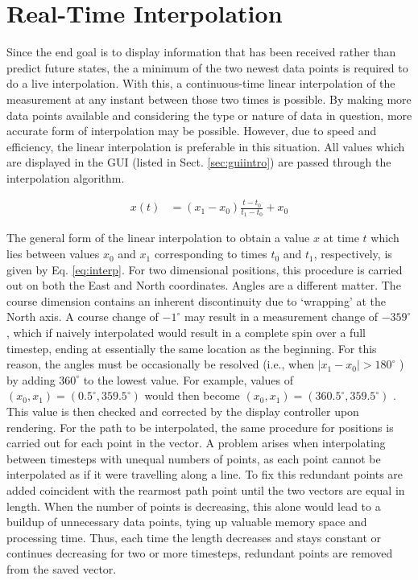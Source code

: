 \documentclass[12pt]{report}
\begin{document}
\section{Real-Time Interpolation} \label{sec:interp}

Since the end goal is to display information that has been received rather than predict future states, the a minimum of the two newest data points is required to do a live interpolation. With this, a continuous-time linear interpolation of the measurement at any instant between those two times is possible. By making more data points available and considering the type or nature of data in question, more accurate form of interpolation may be possible. However, due to speed and efficiency, the linear interpolation is preferable in this situation. All values which are displayed in the GUI (listed in Sect. \ref{sec:guiintro}) are passed through the interpolation algorithm.

\begin{align} \label{eq:interp}
    x(t) &= (x_1 - x_0) \frac{ t - t_0 } { t_1 - t_0 } + x_0
\end{align}

The general form of the linear interpolation to obtain a value $x$ at time $t$ which lies between values $x_0$ and $x_1$ corresponding to times $t_0$ and $t_1$, respectively, is given by Eq. \ref{eq:interp}.
For two dimensional positions, this procedure is carried out on both the East and North coordinates. 
Angles are a different matter. The course dimension contains an inherent discontinuity due to `wrapping' at the North axis. A course change of $-1^\circ$ may result in a measurement change of $-359^\circ$, which if naively interpolated would result in a complete spin over a full timestep, ending at essentially the same location as the beginning. For this reason, the angles must be occasionally be resolved (i.e., when $|x_1 - x_0| > 180^\circ$ ) by adding $360^\circ$ to the lowest value. For example, values of $(x_0, x_1) = (0.5^\circ, 359.5^\circ)$ would then become $(x_0, x_1) = (360.5^\circ, 359.5^\circ)$ .  This value is then checked and corrected by the display controller upon rendering.
For the path to be interpolated,  the same procedure for positions is carried out for each point in the vector. A problem arises when interpolating between timesteps with unequal numbers of points, as each point cannot be interpolated as if it were travelling along a line. To fix this redundant points are added coincident with the rearmost path point until the two vectors are equal in length. When the number of points is decreasing, this alone would lead to a buildup of unnecessary data points, tying up valuable memory space and processing time. Thus, each time the length decreases and stays constant or continues decreasing for two or more timesteps, redundant points are removed from the saved vector.
\end{document}
